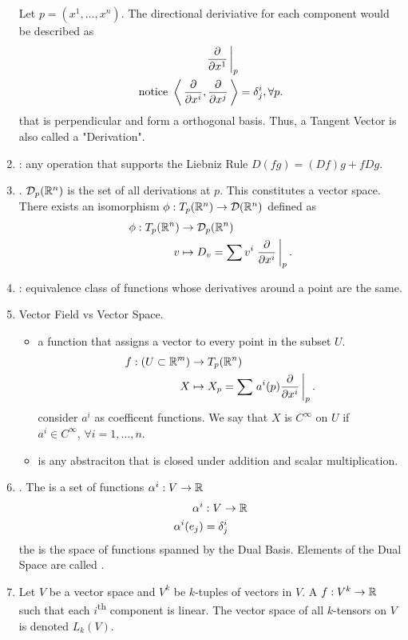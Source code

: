 \documentclass[10pt,a4paper]{report}
\begin{document}
\begin{enumerate}
	Let $p=(x^1, \dots, x^n)$.  The directional deriviative for each component would be described as
	\begin{align*}
		\left . \frac{\partial }{\partial x^1} \, \right |_p& \\
		\text{notice } \left \langle\, \frac{\partial }{\partial x^i}, \frac{\partial }{\partial x^j} \,\right \rangle &= \delta_j^i, \forall p.
	\end{align*}that is perpendicular and form a orthogonal basis.  Thus, a Tangent Vector is also called a "Derivation".
	\item {}: any operation that supports the Liebniz Rule $D(fg) = (Df)g+fDg$.
	\item {}. $\mathcal{D}_p(\mathbb{R}^n)$ is the set of all derivations at $p$.  This constitutes a vector space.  There exists an isomorphism $\phi: T_p(\mathbb{R}^n) \to \mathcal{D}(\mathbb{R}^n)$ defined as
	\begin{align*}
		\phi: T_p(\mathbb{R}^n) &\to \mathcal{D}_p(\mathbb{R}^n)\\
		v &\mapsto D_v=\sum v^i \left . \frac{\partial }{\partial x^i} \, \right |_p.
	\end{align*}
	\item {}: equivalence class of functions whose derivatives around a point are the same.
	\item Vector Field vs Vector Space.  
	\begin{itemize}
		\item {} a function that assigns a vector to every point in the subset $U$. 
		\begin{align*}
			f: (U\subset \mathbb{R}^m) &\to T_p( \mathbb{R}^n) \\
				X &\mapsto X_p=\sum \left . a^i(p) \frac{\partial }{\partial x^i}  \, \right |_p.
		\end{align*}consider $a^i$ as coefficent functions.  We say that $X$ is $C^\infty$ on $U$ if $a^i\in C^\infty, \, \forall i=1,\dots,n$.
		\item {} is any abstraciton that is closed under addition and scalar multiplication.
	\end{itemize}
	\item {}.  The  is a set of functions $\alpha^i: V \to \mathbb{R}$ 
	\begin{align*}
		\alpha^i &: V \to \mathbb{R} \\
			\alpha^i(e_j) &= \delta_j^i
	\end{align*}the  is the space of functions spanned by the Dual Basis. Elements of the Dual Space are called .  
	\item {} Let $V$ be a vector space and $V^k$ be $k$-tuples of vectors in $V$. A  $f: V^k \to \mathbb{R}$ such that each $i$\textsuperscript{th} component is linear.  The vector space of all $k$-tensors on $V$ is denoted $L_k(V)$.
	

\end{enumerate}
\end{document}
